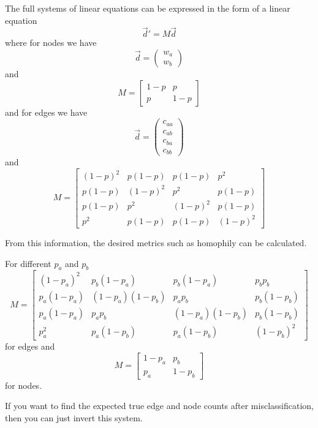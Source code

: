 \documentclass[a4paper]{article}
\begin{document}
The full systems of linear equations can be expressed in the form of a linear equation
\begin{equation*}
\vec{d}' = M\vec{d}
\end{equation*}
where for nodes we have
\begin{equation*}
\vec{d} = \begin{pmatrix}w_a\\w_b\end{pmatrix}
\end{equation*}
and
\begin{equation}
M = \begin{bmatrix}
1-p & p\\
p & 1-p
\end{bmatrix}
\end{equation}
and for edges we have
\begin{equation*}
\vec{d} = \begin{pmatrix}c_{aa}\\c_{ab}\\c_{ba}\\c_{bb}\end{pmatrix}
\end{equation*}
and
\begin{equation} M =
\begin{bmatrix}
(1-p)^2 & p(1-p) & p(1-p) & p^2\\
p(1-p) & (1-p)^2 & p^2 & p(1-p)\\
p(1-p) & p^2 & (1-p)^2 & p(1-p)\\
p^2 & p(1-p) & p(1-p) & (1-p)^2
\end{bmatrix}
\end{equation}

From this information, the desired metrics such as homophily can be calculated.

For different $p_a$ and $p_b$
\begin{equation}M =
\begin{bmatrix}
(1-p_a)^2 & p_b(1-p_a) & p_b(1-p_a) & p_bp_b\\
p_a(1-p_a) & (1-p_a)(1-p_b) & p_ap_b & p_b(1-p_b)\\
p_a(1-p_a) & p_ap_b & (1-p_a)(1-p_b) & p_b(1-p_b)\\
p_a^2 & p_a(1-p_b) & p_a(1-p_b) & (1-p_b)^2
\end{bmatrix}
\end{equation}
for edges and
\begin{equation}
M = \begin{bmatrix}
1-p_a & p_b\\
p_a & 1-p_b
\end{bmatrix}
\end{equation}
for nodes.

If you want to find the expected true edge and node counts after misclassification, then you can just invert this system.


\end{document}
